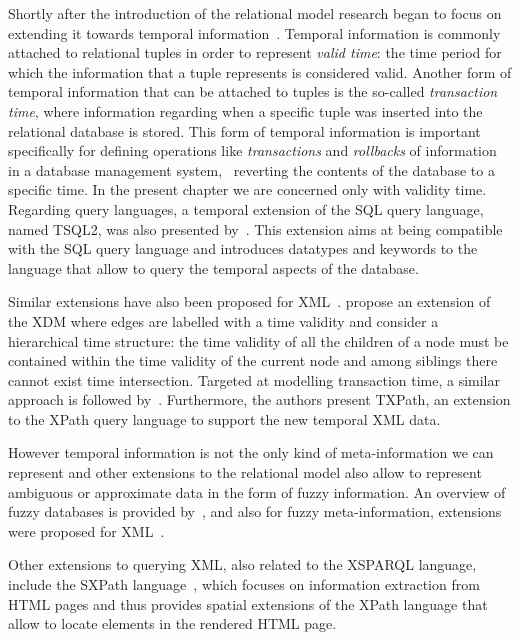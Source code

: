 Shortly after the introduction of the relational model research began to focus on extending it towards temporal
information~\cite{WiederholdFriesWeyl:1975aa,Snodgrass:1990aa,AbiteboulHullVianu:1995aa,Snodgrass:1999aa}.
%
Temporal information is commonly attached to relational tuples in order to represent \emph{valid time}: the time period
for which the information that a tuple represents is considered valid.  Another form of temporal information that can be
attached to tuples is the so-called \emph{transaction time}, where information regarding when a specific tuple was
inserted into the relational database is stored.  This form of temporal information is important specifically for
defining operations like \emph{transactions} and \emph{rollbacks} of information in a database management system,
\eg~reverting the contents of the database to a specific time.  In the present chapter we are concerned only with
validity time.
%
Regarding query languages, a temporal extension of the \ac{SQL} query language, named TSQL2, was also presented
by~\citet{SnodgrassAhnAriav:1994aa}.  This extension aims at being compatible with the \ac{SQL} query language and
introduces datatypes and keywords to the language that allow to query the temporal aspects of the database.

Similar extensions have also been proposed for \ac{XML}~\cite{AmagasaYoshikawaUemura:2000aa,RizzoloVaisman:2008aa}.
\citet{AmagasaYoshikawaUemura:2000aa} propose an extension of the \ac{XDM} where edges are labelled with a time validity
and consider a hierarchical time structure: the time validity of all the children of a node must be contained within the
time validity of the current node and among siblings there cannot exist time intersection.
%
Targeted at modelling transaction time, a similar approach is followed by~\citet{RizzoloVaisman:2008aa}.  Furthermore,
the authors present TXPath, an extension to the \ac{XPath} query language to support the new temporal \ac{XML} data.
%


However temporal information is not the only kind of meta-information we can represent and other extensions to the
relational model also allow to represent ambiguous or approximate data in the form of fuzzy information.  
%
An overview of fuzzy databases is provided by~\citet{MaYan:2008aa}, and also for fuzzy meta-information, extensions were
proposed for \ac{XML}~\cite{MaYan:2007aa}. 

Other extensions to querying \ac{XML}, also related to the XSPARQL language, include the SXPath
language~\cite{OroRuffoloStaab:2010aa}, which focuses on information extraction from \ac{HTML} pages and thus provides
spatial extensions of the XPath language that allow to locate elements in the rendered \ac{HTML} page.




